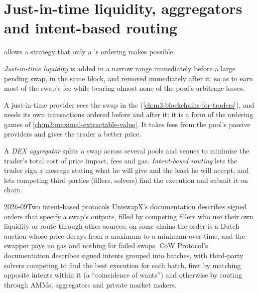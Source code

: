 \section{Just-in-time liquidity, aggregators and intent-based routing}

 allows a strategy that only a 's ordering makes possible.

\begin{definition}\label{def:m3:automated-market-makers:jit}
\emph{Just-in-time liquidity} is  added in a narrow range immediately before a large pending
swap, in the same block, and removed immediately after it, so as to earn most of the swap's fee while bearing almost none of the pool's
arbitrage losses.
\end{definition}

A just-in-time provider sees the swap in the  (\cref{ch:m3:blockchains-for-traders}), and needs its own transactions ordered before and
after it: it is a form of the ordering games of \cref{ch:m3:maximal-extractable-value}. It takes fees from the pool's passive providers and gives
the trader a better price.

\begin{definition}\label{def:m3:automated-market-makers:routing}
A \emph{DEX aggregator} splits a swap across several pools and venues to minimise the trader's total cost of price impact,
fees and gas. \emph{Intent-based routing} lets the trader sign a message stating what he will give and the least he will
accept, and lets competing third parties (fillers, solvers) find the execution and submit it on chain.
\end{definition}

\begin{dated}{2026-09}{Two intent-based protocols}\label{dat:m3:automated-market-makers:intents}
UniswapX's documentation describes signed orders that specify a swap's outputs, filled by competing fillers who use their own liquidity or route
through other sources; on some chains the order is a Dutch auction whose price decays from a maximum to a minimum over time, and the swapper pays
no gas and nothing for failed swaps. CoW Protocol's documentation describes signed intents grouped into batches, with third-party solvers competing to
find the best execution for each batch, first by matching opposite intents within it (a ``coincidence of wants'') and otherwise by routing through
AMMs, aggregators and private market makers.
\end{dated}

